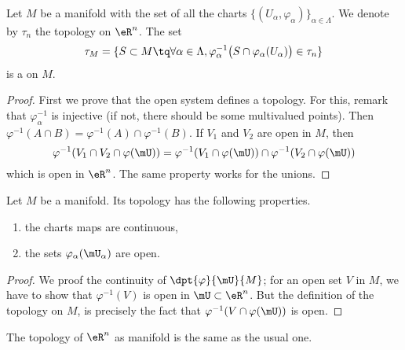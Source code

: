 \begin{propositionDef}      \label{DEFooHGNOooNqGmxE}
	Let \( M\) be a manifold with the set of all the charts \( \{ (U_{\alpha}, \varphi_{\alpha}) \}_{\alpha\in \Lambda}\). We denote by \( \tau_{n}\) the topology on \( \eR^n\).
	The set
	\begin{equation}
		\tau_M=\{ S\subset M\tq \forall \alpha\in \Lambda, \varphi_{\alpha}^{-1}\big( S\cap \varphi_{\alpha}(U_{\alpha}) \big) \in \tau_n \}
	\end{equation}
	is a  on \( M\).
\end{propositionDef}

\begin{proof}
	First we prove that the open system defines a topology. For this, remark that $\varphi_{\alpha}^{-1}$ is injective (if not, there should be some multivalued points). Then $\varphi^{-1}(A\cap B)=\varphi^{-1}(A)\cap\varphi^{-1}(B)$. If $V_1$ and $V_2$ are open in $M$, then
	\begin{equation}
		\varphi^{-1}(V_1\cap V_2\cap\varphi(\mU))=\varphi^{-1}(V_1\cap\varphi(\mU))\cap\varphi^{-1}(V_2\cap\varphi(\mU))
	\end{equation}
	which is open in $\eR^n$. The same property works for the unions.
\end{proof}

\begin{theorem}     \label{THOooIAXUooDqMrav}
	Let \( M\) be a manifold. Its topology has the following properties.
	\begin{enumerate}
		\item the charts maps are continuous,
		\item the sets $\varphi_{\alpha}(\mU_{\alpha})$ are open.
	\end{enumerate}
\end{theorem}

\begin{proof}
	We proof the continuity of $\dpt{\varphi}{\mU}{M}$; for an open set $V$ in $M$, we have to show that $\varphi^{-1}(V)$ is open in $\mU\subset\eR^n$. But the definition of the topology on $M$, is precisely the fact that $\varphi^{-1}(V\cap\varphi(\mU))$ is open.
\end{proof}

\begin{lemma}       \label{LEMooGDMZooLCtnuA}
	The topology of \( \eR^n\) as manifold is the same as the usual one.
\end{lemma}


